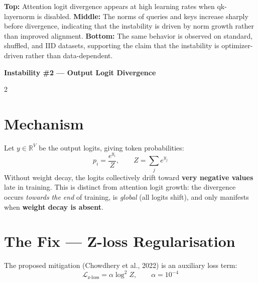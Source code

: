 \documentclass[12pt,a4paper]{article}
\begin{document}
{\footnotesize
\textbf{Top:} Attention logit divergence appears at high learning rates when qk-layernorm is disabled. 
\textbf{Middle:} The norms of queries and keys increase sharply before divergence, indicating that the instability is driven by norm growth rather than improved alignment. 
\textbf{Bottom:} The same behavior is observed on standard, shuffled, and IID datasets, supporting the claim that the instability is optimizer-driven rather than data-dependent.
}
\newpage


\begin{tcolorbox}[
  enhanced, colback=accentorange!15, colframe=accentorange,
  arc=6pt, boxrule=1.5pt, left=10pt, right=10pt, top=6pt, bottom=6pt
]
  {\large\bfseries\color{accentorange} Instability \#2 — Output Logit Divergence}
\end{tcolorbox}

\vspace{8pt}

\begin{multicols}{2}

\section{Mechanism}

Let $y \in \mathbb{R}^V$ be the output logits, giving token probabilities:
\[
p_i = \frac{e^{y_i}}{Z}, \qquad Z = \sum_j e^{y_j}
\]
Without weight decay, the logits collectively drift toward \textbf{very negative values}
late in training.
This is distinct from attention logit growth: the divergence occurs
\emph{towards the end} of training, is \emph{global} (all logits shift), and only
manifests when \textbf{weight decay is absent}.

\columnbreak

\section{The Fix — Z-loss Regularisation}

The proposed mitigation (Chowdhery et al., 2022) is an auxiliary loss term:
\[
\mathcal{L}_{\text{z-loss}} = \alpha \log^2 Z, \qquad \alpha = 10^{-4}
\]


\end{multicols}
\end{document}
